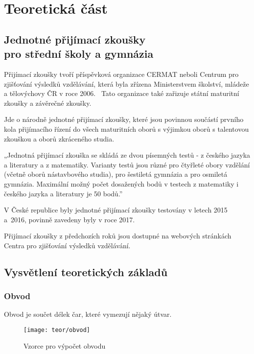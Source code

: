\chapter{Teoretická část}


\section[Jednotné přijímací zkoušky pro střední školy a gymnázia]{Jednotné přijímací zkoušky\\pro střední školy a gymnázia}

Přijímací zkoušky tvoří příspěvková organizace CERMAT neboli Centrum pro zjišťování výsledků vzdělávání, která byla zřízena Ministerstvem školství, mládeže a tělovýchovy ČR v roce 2006.~\cite{zakon_CERMAT} Tato organizace také zařizuje státní maturitní zkoušky a závěrečné zkoušky.~\cite{CERMAT_p_m}



Jde o národně jednotné přijímací zkoušky, které jsou povinnou součástí prvního kola přijímacího řízení do všech maturitních oborů s výjimkou oborů s talentovou zkouškou a oborů zkráceného studia.

„Jednotná přijímací zkouška se skládá ze dvou písemných testů - z českého jazyka a literatury a z matematiky.
Varianty testů jsou různé pro čtyřleté obory vzdělání (včetně oborů nástavbového studia), pro šestiletá gymnázia a pro osmiletá gymnázia.
Maximální možný počet dosažených bodů v testech z matematiky i českého jazyka a literatury je 50 bodů.”~\cite{CERMAT_co_to_je}

V České republice byly jednotné přijímací zkoušky testovány v letech 2015 a~2016, povinně zavedeny byly v roce 2017.~\cite{CERMAT_rocni_zprava}

Přijímací zkoušky z předchozích roků jsou dostupné na webových stránkách Centra pro zjišťování výsledků vzdělávání.~\cite{CERMAT_pdfka}


\section{Vysvětlení teoretických základů}

\subsection{Obvod}
Obvod je součet délek čar, které vymezují nějaký útvar.~\cite{umim_mat}

\begin{figure}[h]
    \centering
    \texttt{[image: teor/obvod]}
    \caption{Vzorce pro výpočet obvodu~\cite{umim_mat}}
\end{figure}

